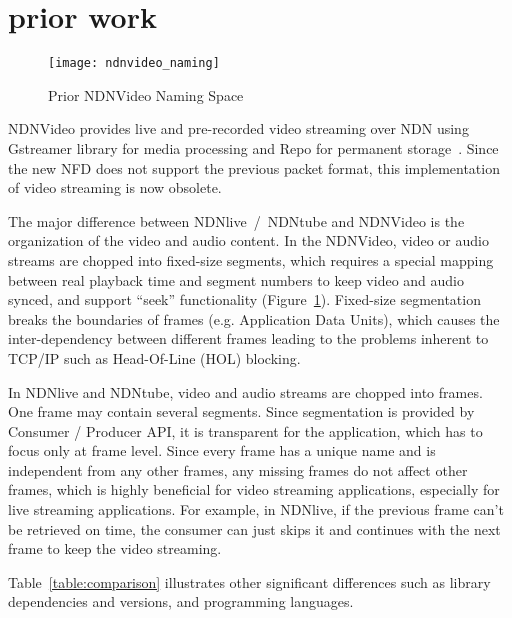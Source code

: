 \section{prior work} %
\label{sec:comparison}
\begin{figure}%
  \centering
  \texttt{[image: ndnvideo\_naming]}
  \vspace{-0.3cm}
  \caption{Prior NDNVideo Naming Space}
  \label{fig:ndnvideo_naming}
  \vspace{-0.2cm}
\end{figure}

NDNVideo provides live and pre-recorded video streaming over NDN using Gstreamer library for media processing and Repo for permanent storage~\cite{ndnvideo}. Since the new NFD does not support the previous packet format, this implementation of video streaming is now obsolete.

The major difference between NDNlive~/~NDNtube and NDNVideo is the organization of the video and audio content. In the NDNVideo, video or audio streams are chopped into fixed-size segments, which requires a special mapping between real playback time and segment numbers to keep video and audio synced, and support ``seek'' functionality (Figure~\ref{fig:ndnvideo_naming}). Fixed-size segmentation breaks the boundaries of frames (e.g. Application Data Units), which causes the inter-dependency between different frames leading to the problems inherent to TCP/IP such as Head-Of-Line (HOL) blocking.

In NDNlive and NDNtube, video and audio streams are chopped into frames. One frame may contain several segments. Since segmentation is provided by Consumer / Producer API, it is transparent for the application, which has to focus only at frame level. Since every frame has a unique name and is independent from any other frames, any missing frames do not affect other frames, which is highly beneficial for video streaming applications, especially for live streaming applications. For example, in NDNlive, if the previous frame can't be retrieved on time, the consumer can just skips it and continues with the next frame to keep the video streaming. 

Table~\ref{table:comparison} illustrates other significant differences such as library dependencies and versions, and programming languages.


